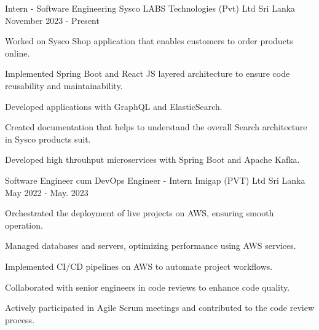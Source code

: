 

\begin{cventries}

  \cventry
  {Intern - Software Engineering} %
  {Sysco LABS Technologies (Pvt) Ltd} %
  {Sri Lanka} %
  {November 2023 - Present} %
  {
    \begin{cvitems} %
      \item {Worked on Sysco Shop application that enables customers to order products online.}
      \item {Implemented Spring Boot and React JS layered architecture to ensure code reusability and maintainability.}
      \item {Developed applications with GraphQL and ElasticSearch.}
      \item {Created documentation that helps to understand the overall Search architecture in Sysco products suit.}
      \item {Developed high throuhput microservices with Spring Boot and Apache Kafka.}
    \end{cvitems}
  }

  \cventry
  {Software Engineer cum DevOps Engineer - Intern} %
  {Imigap (PVT) Ltd} %
  {Sri Lanka} %
  {May 2022 - May. 2023} %
  {
    \begin{cvitems} %
      \item {Orchestrated the deployment of live projects on AWS, ensuring smooth operation.}
      \item {Managed databases and servers, optimizing performance using AWS services.}
      \item {Implemented CI/CD pipelines on AWS to automate project workflows.}
      \item {Collaborated with senior engineers in code reviews to enhance code quality.}
      \item {Actively participated in Agile Scrum meetings and contributed to the code review process.}
    \end{cvitems}
  }


\end{cventries}
